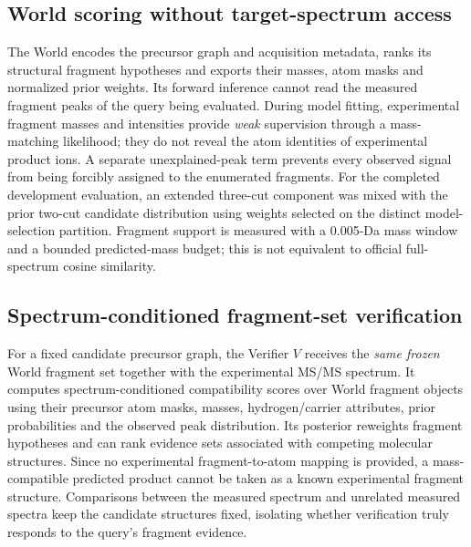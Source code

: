 \documentclass[12pt]{article}
\begin{document}
\subsection{World scoring without target-spectrum access}
The World encodes the precursor graph and acquisition metadata, ranks its structural fragment hypotheses and exports their masses, atom masks and normalized prior weights. Its forward inference cannot read the measured fragment peaks of the query being evaluated. During model fitting, experimental fragment masses and intensities provide \emph{weak} supervision through a mass-matching likelihood; they do not reveal the atom identities of experimental product ions. A separate unexplained-peak term prevents every observed signal from being forcibly assigned to the enumerated fragments. For the completed development evaluation, an extended three-cut component was mixed with the prior two-cut candidate distribution using weights selected on the distinct model-selection partition. Fragment support is measured with a 0.005-Da mass window and a bounded predicted-mass budget; this is not equivalent to official full-spectrum cosine similarity.

\subsection{Spectrum-conditioned fragment-set verification}
For a fixed candidate precursor graph, the Verifier $V$ receives the \emph{same frozen} World fragment set together with the experimental MS/MS spectrum. It computes spectrum-conditioned compatibility scores over World fragment objects using their precursor atom masks, masses, hydrogen/carrier attributes, prior probabilities and the observed peak distribution. Its posterior reweights fragment hypotheses and can rank evidence sets associated with competing molecular structures. Since no experimental fragment-to-atom mapping is provided, a mass-compatible predicted product cannot be taken as a known experimental fragment structure. Comparisons between the measured spectrum and unrelated measured spectra keep the candidate structures fixed, isolating whether verification truly responds to the query's fragment evidence.
\end{document}
